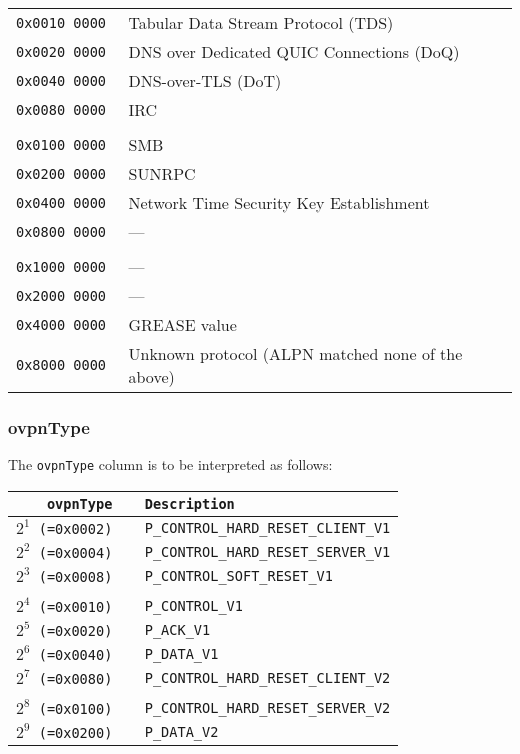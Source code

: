 \documentclass[documentation]{subfiles}
\begin{document}
\begin{longtable}{>{\tt}rl}
    0x0010 0000 & Tabular Data Stream Protocol (TDS)\\
    0x0020 0000 & DNS over Dedicated QUIC Connections (DoQ)\\
    0x0040 0000 & DNS-over-TLS (DoT)\\
    0x0080 0000 & IRC\\
    \\
    0x0100 0000 & SMB\\
    0x0200 0000 & SUNRPC\\
    0x0400 0000 & Network Time Security Key Establishment\\
    0x0800 0000 & ---\\
    \\
    0x1000 0000 & ---\\
    0x2000 0000 & ---\\
    0x4000 0000 & GREASE value\\
    0x8000 0000 & Unknown protocol (ALPN matched none of the above)\\
    \bottomrule
\end{longtable}

\subsubsection{ovpnType}\label{ovpnType}
The {\tt ovpnType} column is to be interpreted as follows:
\begin{longtable}{>{\tt}r>{\tt}l}
    \toprule
    {\bf ovpnType} & {\bf Description} \\
    \midrule\endhead%
    $2^{1}$ (=0x0002) & P\_CONTROL\_HARD\_RESET\_CLIENT\_V1\\
    $2^{2}$ (=0x0004) & P\_CONTROL\_HARD\_RESET\_SERVER\_V1\\
    $2^{3}$ (=0x0008) & P\_CONTROL\_SOFT\_RESET\_V1\\
    \\
    $2^{4}$ (=0x0010) & P\_CONTROL\_V1\\
    $2^{5}$ (=0x0020) & P\_ACK\_V1\\
    $2^{6}$ (=0x0040) & P\_DATA\_V1\\
    $2^{7}$ (=0x0080) & P\_CONTROL\_HARD\_RESET\_CLIENT\_V2\\
    \\
    $2^{8}$ (=0x0100) & P\_CONTROL\_HARD\_RESET\_SERVER\_V2\\
    $2^{9}$ (=0x0200) & P\_DATA\_V2\\
    \bottomrule
\end{longtable}
\end{document}
